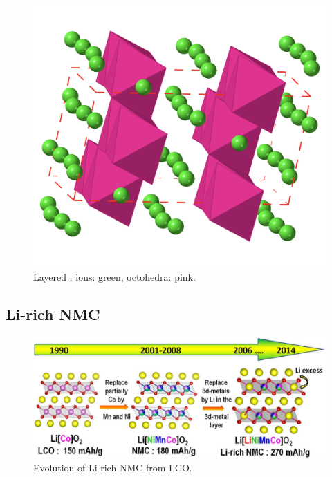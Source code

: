\begin{figure}
\centering
\includegraphics[width=0.6\linewidth]{figures/structures/Li2MnO3}
\caption[]{Layered .  ions: green;  octohedra: pink.} 
\label{fig:Li2MnO3}
\end{figure}





\newpage
\subsection{Li-rich NMC}
\begin{figure}
\centering
\includegraphics[width=\linewidth]{figures/structures/tarasconNMC}
\caption[Evolution of Li-rich NMC from LCO.]{Evolution of Li-rich NMC from LCO.\cite{Rozier2015}} 
\label{fig:tarasconNMC}
\end{figure}

